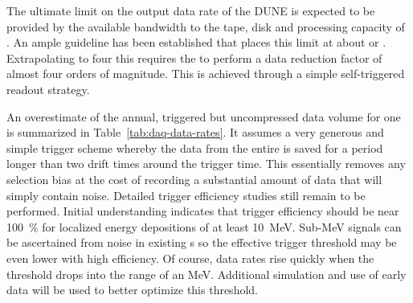 The ultimate limit on the output data rate of the DUNE   is
expected to be provided by the available bandwidth to the tape,
disk and processing capacity of \fnal. 
An ample guideline has been established that places this limit at
about \offsitepbpy or \offsitegbps.
Extrapolating to four  this requires the  to
perform a data reduction factor of almost four orders of magnitude. 
This is achieved through a simple self-triggered readout strategy.

An overestimate of the annual, triggered but uncompressed data volume
for one \nominalmodsize  {} is summarized in
Table~\ref{tab:daq-data-rates}. 
It assumes a very generous and simple trigger scheme whereby the data
from the entire  is saved for a period longer than
two drift times around the trigger time.
This essentially removes any selection bias at the cost of
recording a substantial amount of data that will simply contain noise.
Detailed trigger efficiency studies still remain to be performed. 
Initial understanding indicates that trigger efficiency should be near
\SI{100}{\%} for localized energy depositions of at least \SI{10}{\MeV}. 
Sub-\si{\MeV} signals can be ascertained from noise in existing \lartpc{}s
so the effective trigger threshold may be even lower with high
efficiency. 
Of course, data rates rise quickly when the threshold drops into the
range of an \si{\MeV}. 
Additional simulation and use of early data will be used to better
optimize this threshold.

